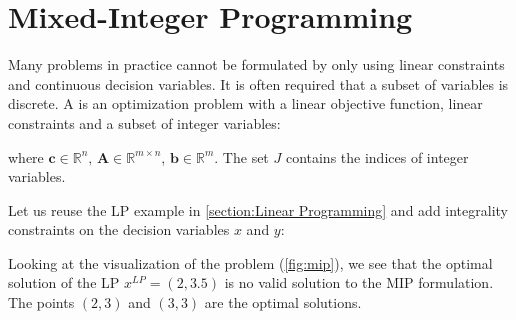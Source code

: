 \section{Mixed-Integer Programming} \label{section:MIP}
Many problems in practice cannot be formulated by only using linear constraints and continuous decision variables. It is often required that a subset of variables is discrete. A  is an optimization problem with a linear objective function, linear constraints and a subset of integer variables:
 where $\mathbf c \in \mathbb{R}^n, \, \mathbf A \in \mathbb{R}^{m \times n}$, $\mathbf b \in \mathbb{R}^m$. The set $J$ contains the indices of integer variables. 

Let us reuse the LP example in \cref{section:Linear Programming} and add integrality constraints on the decision variables $x$ and $y$:
Looking at the visualization of the problem (\cref{fig:mip}), we see that the optimal solution of the LP $x^{LP} = (2,3.5)$ is no valid solution to the MIP formulation. The points $(2,3)$ and $(3,3)$ are the optimal solutions.

